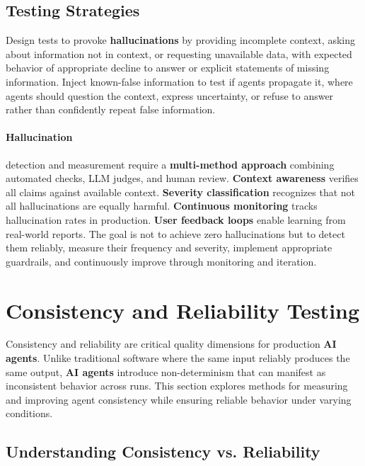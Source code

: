 \begin{TNtwocol}
\subsection*{Testing Strategies}

Design tests to provoke \textbf{hallucinations} by providing incomplete context, asking about information not in context, or requesting unavailable data, with expected behavior of appropriate decline to answer or explicit statements of missing information. Inject known-false information to test if agents propagate it, where agents should question the context, express uncertainty, or refuse to answer rather than confidently repeat false information.



\paragraph{\textbf{Hallucination}} detection and measurement require a \textbf{multi-method approach} combining automated checks, LLM judges, and human review. \textbf{Context awareness} verifies all claims against available context. \textbf{Severity classification} recognizes that not all hallucinations are equally harmful. \textbf{Continuous monitoring} tracks hallucination rates in production. \textbf{User feedback loops} enable learning from real-world reports. The goal is not to achieve zero hallucinations but to detect them reliably, measure their frequency and severity, implement appropriate guardrails, and continuously improve through monitoring and iteration.

\section{Consistency and Reliability Testing}



Consistency and reliability are critical quality dimensions for production \textbf{AI agents}. Unlike traditional software where the same input reliably produces the same output, \textbf{AI agents} introduce non-determinism that can manifest as inconsistent behavior across runs. This section explores methods for measuring and improving agent consistency while ensuring reliable behavior under varying conditions.

\subsection*{Understanding Consistency vs. Reliability}


\end{TNtwocol}
